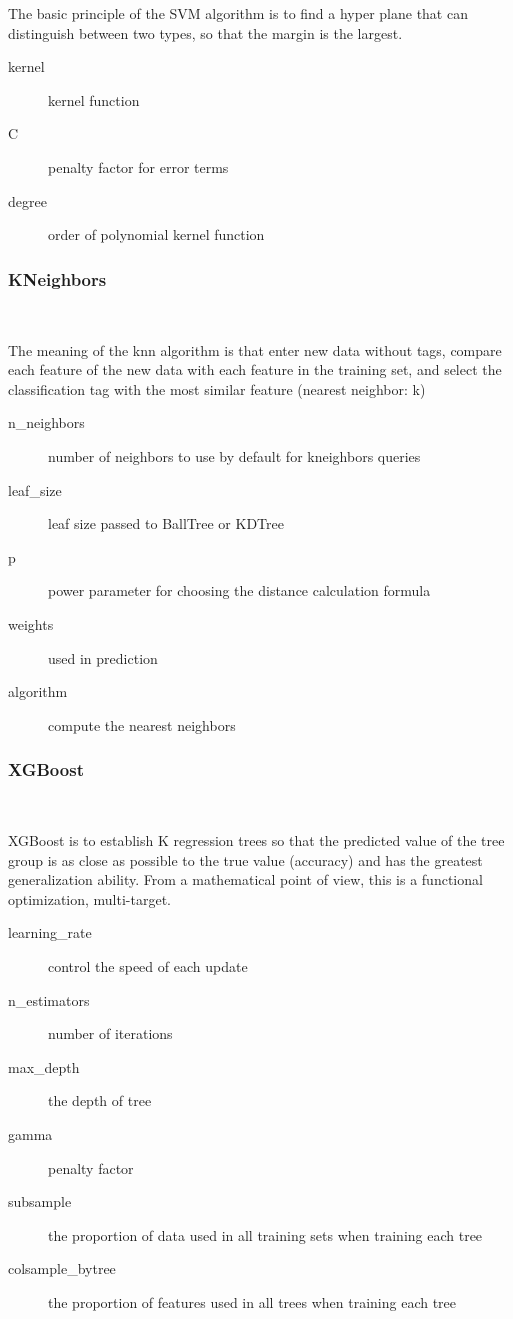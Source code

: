 The basic principle of the SVM algorithm is 
to find a hyper plane that can 
distinguish between two types, 
so that the margin is the largest.


\begin{description}
	\item[kernel] kernel function
	\item[C] penalty factor for error terms
	\item[degree] order of polynomial kernel function
\end{description}
	
\subsubsection{KNeighbors}
\

The meaning of the knn algorithm is that 
enter new data without tags, 
compare each feature of the new data with 
each feature in the training set, 
and select the classification tag with 
the most similar feature (nearest neighbor: k)


\begin{description}
	\item[n_neighbors] number of neighbors to use 
	by default for kneighbors queries
	\item[leaf_size] leaf size passed to BallTree or KDTree
	\item[p] power parameter for choosing 
	the distance calculation formula
	\item[weights] used in prediction
	\item[algorithm] compute the nearest neighbors
	\end{description}
	
\subsubsection{XGBoost}
\
 
XGBoost is to establish K regression trees 
so that the predicted value of 
the tree group is as close as possible to 
the true value (accuracy) and 
has the greatest generalization ability. 
From a mathematical point of view, 
this is a functional optimization, multi-target.

\begin{description}
	\item[learning_rate]  control the speed of each update
	\item[n_estimators] number of iterations
	\item[max_depth] the depth of tree
	\item[gamma] penalty factor%
	\item[subsample] the proportion of data used in 
		all training sets when training each tree
	\item[colsample_bytree] the proportion of features used 
		in all trees when training each tree
	\end{description}

